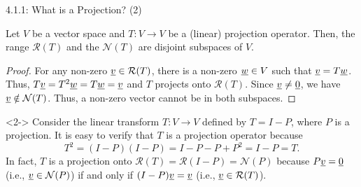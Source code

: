 \documentclass[10pt,english,aspectratio=169]{beamer}
\begin{document}
\begin{frame}{4.1.1:  What is a Projection? (2)}

\begin{theorem}
Let $V$ be a vector space and $T \colon V \rightarrow V$ be a (linear) projection operator.
Then, the range $\mathcal{R}(T)$ and the $\mathcal{N}(T)$ are disjoint subspaces of $V$.
\end{theorem}

\begin{proof}
For any non-zero $\underline{v} \in \mathcal{R}(T)$, there is a non-zero $\underline{w} \in V$ such that $\underline{v} = T\underline{w}$.  Thus, $T\underline{v} = T^2  \underline{w} = T \underline{w} = \underline{v}$ and $T$ projects onto $\mathcal{R}(T)$. Since $\underline{v} \neq \underline{0}$, we have $\underline{v} \notin \mathcal{N}(T)$.
Thus, a non-zero vector cannot be in both subspaces. 
\end{proof}

\begin{example}<2->
Consider the linear transform $T \colon V \rightarrow V$ defined by $T = I - P$, where $P$ is a projection.
It is easy to verify that $T$ is a projection operator because \vspace{-2mm}
\[ T^2 = (I-P)(I-P) = I - P- P + P^2 = I-P = T .\]
In fact, $T$ is a projection onto $\mathcal{R}(T) = \mathcal{R}(I-P) = \mathcal{N}(P)$ because $P \underline{v} = \underline{0}$ (i.e., $\underline{v} \in \mathcal{N}(P)$) if and only if  $(I-P)\underline{v} = \underline{v}$ (i.e., $\underline{v} \in \mathcal{R}(T)$).
\end{example}

\end{frame}
\end{document}

